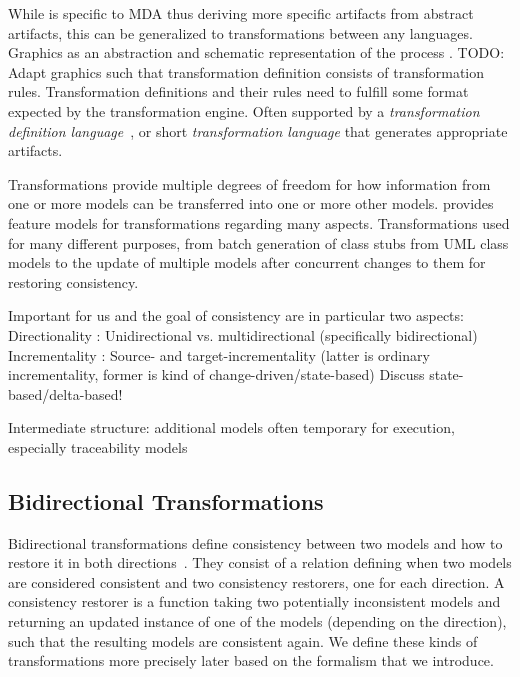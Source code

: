 While \textcite{kleppe2003mdaExplained-Book} is specific to \gls{MDA} thus deriving more specific artifacts from abstract artifacts, this can be generalized to transformations between any languages.
Graphics as an abstraction and schematic representation of the process \cite[Fig.~9-5]{kleppe2003mdaExplained-Book}.
TODO: Adapt graphics such that transformation definition consists of transformation rules.
Transformation definitions and their rules need to fulfill some format expected by the transformation engine.
Often supported by a \emph{transformation definition language}~\cite[Sec. 9.2]{kleppe2003mdaExplained-Book}, or short \emph{transformation language} that generates appropriate artifacts.

Transformations provide multiple degrees of freedom for how information from one or more models can be transferred into one or more other models.
\textcite{czarnecki2006a} provides feature models for transformations regarding many aspects.
Transformations used for many different purposes, from batch generation of class stubs from UML class models to the update of multiple models after concurrent changes to them for restoring consistency.

Important for us and the goal of consistency are in particular two aspects:
Directionality \cite[Fig.~19]{czarnecki2006a}: Unidirectional vs. multidirectional (specifically bidirectional)
Incrementality \cite[Fig.~19]{czarnecki2006a}: Source- and target-incrementality (latter is ordinary incrementality, former is kind of change-driven/state-based)
Discuss state-based/delta-based!

Intermediate structure: additional models often temporary for execution, especially traceability models


\subsection{Bidirectional Transformations}
\label{chap:foundations:transformations:bidirectional}

Bidirectional transformations define consistency between two models and how to restore it in both directions~\cite{stevens2010sosym}.
They consist of a relation defining when two models are considered consistent and two consistency restorers, one for each direction.
A consistency restorer is a function taking two potentially inconsistent models and returning an updated instance of one of the models (depending on the direction), such that the resulting models are consistent again.
We define these kinds of transformations more precisely later based on the formalism that we introduce.

